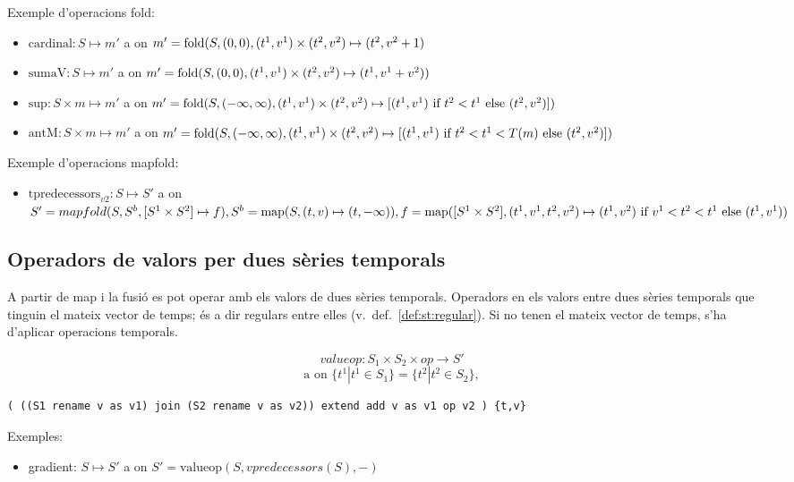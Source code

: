 Exemple d'operacions fold:
\begin{itemize}
\item $\text{cardinal}: S \mapsto m'$ a on $m'=
  \operatorname*{fold}(S,(0,0),(t^1,v^1)\times(t^2,v^2)\mapsto(t^2,v^2+1)$
\item $\text{sumaV}: S \mapsto m'$ a on $m'=
  \operatorname*{fold}(S,(0,0),(t^1,v^1)\times(t^2,v^2)\mapsto(t^1,v^1+v^2))$
\item $\text{sup}: S \times m \mapsto m'$ a on $m'=
  \operatorname*{fold}(S,(-\infty,\infty),(t^1,v^1)\times(t^2,v^2)\mapsto [(t^1,v^1)
  \text{ if } t^2 < t^1 \text{ else } (t^2,v^2) ])$
\item $\text{antM}: S \times m \mapsto m'$ a on $m'=
  \operatorname*{fold}(S,(-\infty,\infty),(t^1,v^1)\times(t^2,v^2)\mapsto [(t^1,v^1)
  \text{ if } t^2 < t^1 < T(m) \text{ else } (t^2,v^2) ])$
\end{itemize}


Exemple d'operacions mapfold:
\begin{itemize}
\item $\text{tpredecessors}_{v2}: S \mapsto S'$ a on $S'=
  mapfold(S,S^b,[S^1\times S^2]\mapsto f), S^b =
  \operatorname*{map}(S,(t,v)\mapsto(t,-\infty)), f=\operatorname*{map}([S^1\times
  S^2],(t^1,v^1,t^2,v^2)\mapsto (t^1,v^2) \text{ if } v^1<t^2<t^1
  \text{ else } (t^1,v^1))$
\end{itemize}


\subsection{Operadors de valors per dues sèries temporals}
A partir de map i la fusió es pot operar amb els valors de dues sèries
temporals.  Operadors en els valors entre dues sèries temporals que
tinguin el mateix vector de temps; és a dir regulars entre elles (v.\
def.~\ref{def:st:regular}). Si no tenen el mateix vector de temps,
s'ha d'aplicar operacions temporals. \todo{ref més endavant}

\[
valueop: S_1 \times S_2 \times op \longrightarrow S'
\]
\[
\text{a on } \{t^1|t^1\in S_1\} = \{t^2|t^2\in S_2\}, 
\]

\begin{verbatim} 
( ((S1 rename v as v1) join (S2 rename v as v2)) extend add v as v1 op v2 ) {t,v}
\end{verbatim}



Exemples:
\begin{itemize}
\item gradient: $S \mapsto S'$ a on $S'= \text{valueop}(S,vpredecessors(S),-)$
\end{itemize}




